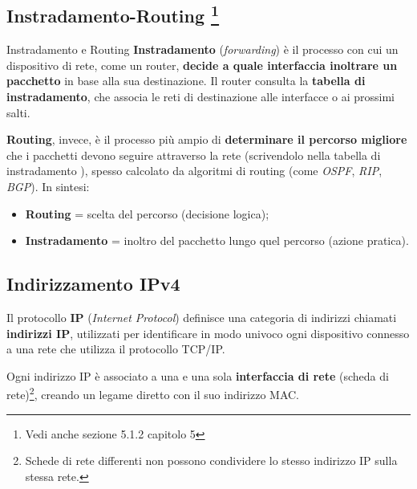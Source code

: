 \documentclass[a4paper,12pt]{report}
\begin{document}
\subsection*{Instradamento-Routing \footnote{Vedi anche sezione 5.1.2 capitolo 5}}

\begin{notebox}{Instradamento e Routing}
\textbf{Instradamento} (\textit{forwarding}) è il processo con cui un dispositivo di rete, come un router, \textbf{decide a quale interfaccia inoltrare un pacchetto} in base alla sua destinazione.  
Il router consulta la \textbf{tabella di instradamento}, che associa le reti di destinazione alle interfacce o ai prossimi salti.


\textbf{Routing}, invece, è il processo più ampio di \textbf{determinare il percorso migliore} che i pacchetti devono seguire attraverso la rete (scrivendolo nella tabella di instradamento ), spesso calcolato da algoritmi di routing (come \textit{OSPF}, \textit{RIP}, \textit{BGP}).  
In sintesi:
\begin{itemize}
    \item \textbf{Routing} = scelta del percorso (decisione logica);
    \item \textbf{Instradamento} = inoltro del pacchetto lungo quel percorso (azione pratica).
\end{itemize}
\end{notebox}
\vspace{3cm}

\newpage
\subsection{Indirizzamento IPv4}

Il protocollo \textbf{IP} (\textit{Internet Protocol}) definisce una categoria di indirizzi chiamati \textbf{indirizzi IP}, utilizzati per identificare in modo univoco ogni dispositivo connesso a una rete che utilizza il protocollo TCP/IP.  

Ogni indirizzo IP è associato a una e una sola \textbf{interfaccia di rete} (scheda di rete)\footnote{Schede di rete differenti non possono condividere lo stesso indirizzo IP sulla stessa rete.}, creando un legame diretto con il suo indirizzo MAC.
\end{document}
